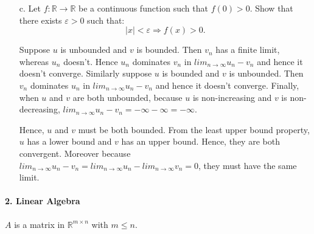 \documentclass[11pt]{article}
\newcommand{\eps}{\varepsilon}
\newcommand{\R}{\mathbb{R}}                     %
\begin{document}
\begin{itemize}
\item[c.] Let $f:\R\to\R$ be a continuous function such that $f(0) > 0$.
Show that there exists $\eps>0$ such that:
\begin{displaymath}
    |x|< \eps \Rightarrow f(x) > 0.
\end{displaymath}

\color{blue}
Suppose $u$ is unbounded and $v$ is bounded. Then $v_n$ has a finite limit, whereas $u_n$ doesn't. Hence $u_n$ dominates $v_n$ in $lim_{n\rightarrow \infty}u_n-v_n$ and hence it doesn't converge. Similarly suppose $u$ is bounded and $v$ is unbounded. Then $v_n$ dominates $u_n$ in $lim_{n\rightarrow \infty}u_n-v_n$ and hence it doesn't converge. Finally, when $u$ and $v$ are both unbounded, because $u$ is non-increasing and $v$ is non-decreasing, $lim_{n\rightarrow \infty}u_n-v_n=-\infty-\infty=-\infty$.

Hence, $u$ and $v$ must be both bounded. From the least upper bound property, $u$ has a lower bound and $v$ has an upper bound. Hence, they are both convergent. Moreover because $lim_{n\rightarrow \infty}u_n-v_n=lim_{n\rightarrow \infty}u_n-lim_{n\rightarrow \infty}v_n=0$, they must have the same limit.
\color{black}


\end{itemize}


\paragraph{2. Linear Algebra}

$A$ is a matrix in $\R^{m\times n}$ with $m\leq n$.
\end{document}
